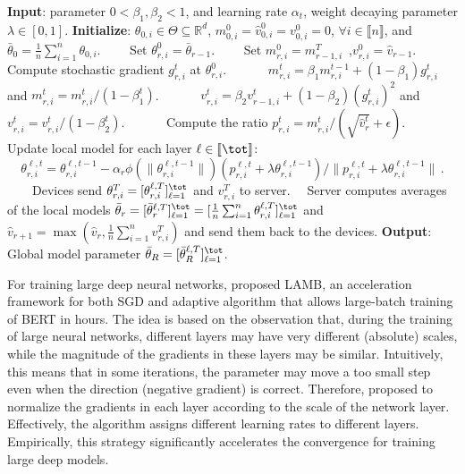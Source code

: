 \documentclass[nohyperref]{article}
\begin{document}
\begin{algorithm}[t]
\caption{\algo\ } \label{alg:ldams}
\begin{algorithmic}[1]
\STATE \textbf{Input}: parameter $0< \beta_1, \beta_2 <1$, and learning rate $\alpha_t$, weight decaying parameter $\lambda \in [0,1]$.
\STATE \textbf{Initialize}: $\theta_{0,i} \in \Theta \subseteq \mathbb R^d $, $m^0_{0,i}=\hat v^0_{0,i}=v^0_{0,i} = 0$, $\forall i\in \llbracket n\rrbracket$, and $\bar{\theta}_0 =  \frac{1}{n} \sum_{i=1}^n \theta_{0,i}$.
\STATE $\qquad$Set $\theta_{r,i}^{0} = \bar{\theta}_{r-1}$.
\STATE $\qquad$Set $m^{0}_{r,i} = m^T_{r-1,i}$\ ,\quad $v^{0}_{r,i} = \hat{v}_{r-1}$.
\STATE $\qquad\quad$Compute stochastic gradient $g^t_{r,i}$ at $\theta_{r,i}^{0}$.
\STATE $\qquad\quad$$m^t_{r,i} = \beta_1 m^{t-1}_{r,i} + (1 - \beta_1) g^t_{r,i}$ and $m^{t}_{r,i}=m^{t}_{r,i} /\left(1-\beta_{1}^{t}\right)$. \label{line:new1}
\STATE $\qquad\quad$$v^{t}_{r,i} = \beta_2 v^{t}_{r-1,i} + (1 - \beta_2) (g^t_{r,i})^2$ and $v^{t}_{r,i}=v^{t}_{r,i} /\left(1-\beta_{2}^{t}\right)$. \label{line:new2}
\STATE $\qquad\quad$Compute the ratio  $p_{r,i}^t=m^{t}_{r,i}/(\sqrt{\hat v^{t}_{r}}+\epsilon)$. \label{line:scale}
\STATE $\qquad\quad$Update local model for each layer $\ell \in \llbracket \tot \rrbracket$: \label{line:layer}
\begin{equation}\label{eq:upadtelayer}
    \theta_{r,i}^{\ell,t}=\theta_{r,i}^{\ell,t-1}-\alpha_{r} \phi(\|\theta_{r,i}^{\ell,t-1}\|)(p_{r,i}^{\ell,t}+\lambda \theta_{r,i}^{\ell,t-1})/ \|p_{r,i}^{\ell,t}+\lambda \theta_{r,i}^{\ell,t-1}\|\, .
\end{equation}
\ENDFOR
\STATE $\qquad$Devices send $\theta_{r,i}^{T} = [\theta_{r,i}^{\ell,T}]_{\ell =1}^{\tot}$ and $v_{r,i}^T$ to server.
\ENDFOR
\STATE $\quad$Server computes averages of the local models $\bar{\theta}_r = [\bar{\theta}_r^{\ell,T}]_{\ell =1}^{\tot} = [\frac{1}{n} \sum_{i=1}^n \theta_{r,i}^{\ell,T}]_{\ell =1}^{\tot}$ and $\hat{v}_{r+1} = \max( \hat{v}_{r},\frac{1}{n} \sum_{i=1}^n v^T_{r,i} )$ and send them back to the devices. \label{line:final}
\ENDFOR
\STATE \textbf{Output}: Global model parameter $\bar{\theta}_R = [\bar{\theta}_R^{\ell,T}]_{\ell =1}^{\tot}$.
\end{algorithmic}
\end{algorithm}

For training large deep neural networks, \cite{you2019large} proposed LAMB, an acceleration framework for both SGD and adaptive algorithm that allows large-batch training of BERT in hours. The idea is based on the observation that, during the training of large neural networks, different layers may have very different (absolute) scales, while the magnitude of the gradients in these layers may be similar. Intuitively, this means that in some iterations, the parameter may move a too small step even when the direction (negative gradient) is correct. Therefore, \cite{you2019large} proposed to normalize the gradients in each layer according to the scale of the network layer. Effectively, the algorithm assigns different learning rates to different layers. Empirically, this strategy significantly accelerates the convergence for training large deep models.
\end{document}
